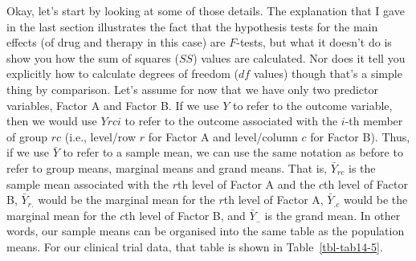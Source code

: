 \documentclass[
  a4paper,
]{book}
\begin{document}
Okay, let's start by looking at some of those details. The explanation
that I gave in the last section illustrates the fact that the hypothesis
tests for the main effects (of drug and therapy in this case) are
\(F\)-tests, but what it doesn't do is show you how the sum of squares
(\(SS\)) values are calculated. Nor does it tell you explicitly how to
calculate degrees of freedom (\(df\) values) though that's a simple
thing by comparison. Let's assume for now that we have only two
predictor variables, Factor A and Factor B. If we use \(Y\) to refer to
the outcome variable, then we would use \(Y{rci}\) to refer to the
outcome associated with the \(i\)-th member of group \(rc\) (i.e.,
level/row \(r\) for Factor A and level/column \(c\) for Factor B). Thus,
if we use \(\bar{Y}\) to refer to a sample mean, we can use the same
notation as before to refer to group means, marginal means and grand
means. That is, \(\bar{Y}_{rc}\) is the sample mean associated with the
\(r\)th level of Factor A and the \(c\)th level of Factor B,
\(\bar{Y}_{r.}\) would be the marginal mean for the \(r\)th level of
Factor A, \(\bar{Y}_{.c}\) would be the marginal mean for the \(c\)th
level of Factor B, and \(\bar{Y}_{..}\) is the grand mean. In other
words, our sample means can be organised into the same table as the
population means. For our clinical trial data, that table is shown in
Table~\ref{tbl-tab14-5}.

\hypertarget{tbl-tab14-5}{}
 
  \providecommand{\huxb}[2]{\arrayrulecolor[RGB]{#1}\global\arrayrulewidth=#2pt}
  \providecommand{\huxvb}[2]{\color[RGB]{#1}\vrule width #2pt}
  \providecommand{\huxtpad}[1]{\rule{0pt}{#1}}
  \providecommand{\huxbpad}[1]{\rule[-#1]{0pt}{#1}}
\end{document}
